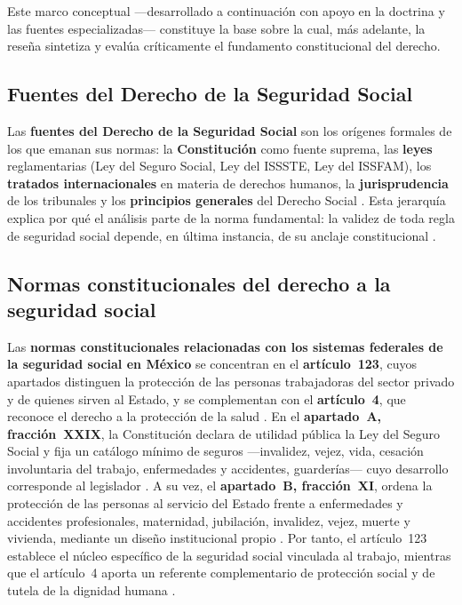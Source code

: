 \documentclass[12pt,letterpaper,oneside]{article}
\begin{document}
Este marco conceptual —desarrollado a continuaci\'on con apoyo en la doctrina y las fuentes especializadas— constituye la base sobre la cual, m\'as adelante, la rese\~na sintetiza y eval\'ua cr\'iticamente el fundamento constitucional del derecho.

\subsection{Fuentes del Derecho de la Seguridad Social}
Las \textbf{fuentes del Derecho de la Seguridad Social} son los or\'igenes formales de los que emanan sus normas: la \textbf{Constituci\'on} como fuente suprema, las \textbf{leyes} reglamentarias (Ley del Seguro Social, Ley del ISSSTE, Ley del ISSFAM), los \textbf{tratados internacionales} en materia de derechos humanos, la \textbf{jurisprudencia} de los tribunales y los \textbf{principios generales} del Derecho Social \citep{bricenoRuiz2011,belmontLugoParra2017}. Esta jerarqu\'ia explica por qu\'e el an\'alisis parte de la norma fundamental: la validez de toda regla de seguridad social depende, en \'ultima instancia, de su anclaje constitucional \citep{cpeum2026}.

\subsection{Normas constitucionales del derecho a la seguridad social}
Las \textbf{normas constitucionales relacionadas con los sistemas federales de la seguridad social en M\'exico} se concentran en el \textbf{art\'iculo~123}, cuyos apartados distinguen la protecci\'on de las personas trabajadoras del sector privado y de quienes sirven al Estado, y se complementan con el \textbf{art\'iculo~4}, que reconoce el derecho a la protecci\'on de la salud \citep{cpeum2026}. En el \textbf{apartado~A, fracci\'on~XXIX}, la Constituci\'on declara de utilidad p\'ublica la Ley del Seguro Social y fija un cat\'alogo m\'inimo de seguros —invalidez, vejez, vida, cesaci\'on involuntaria del trabajo, enfermedades y accidentes, guarder\'ias— cuyo desarrollo corresponde al legislador \citep{bricenoRuiz2011}. A su vez, el \textbf{apartado~B, fracci\'on~XI}, ordena la protecci\'on de las personas al servicio del Estado frente a enfermedades y accidentes profesionales, maternidad, jubilaci\'on, invalidez, vejez, muerte y vivienda, mediante un dise\~no institucional propio \citep{cpeum2026,gonzalezCarvallo2024}. Por tanto, el art\'iculo~123 establece el n\'ucleo espec\'ifico de la seguridad social vinculada al trabajo, mientras que el art\'iculo~4 aporta un referente complementario de protecci\'on social y de tutela de la dignidad humana \citep{ibarraOlguin2022,hernandezInclusion2020}.
\end{document}

